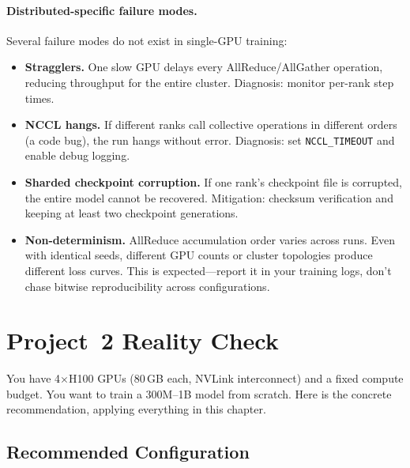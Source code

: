 \paragraph{Distributed-specific failure modes.} Several failure modes do not exist in single-GPU training:

\begin{itemize}[nosep]
  \item \textbf{Stragglers.} One slow GPU delays every AllReduce/AllGather operation, reducing throughput for the entire cluster. Diagnosis: monitor per-rank step times.
  \item \textbf{NCCL hangs.} If different ranks call collective operations in different orders (a code bug), the run hangs without error. Diagnosis: set \texttt{NCCL\_TIMEOUT} and enable debug logging.
  \item \textbf{Sharded checkpoint corruption.} If one rank's checkpoint file is corrupted, the entire model cannot be recovered. Mitigation: checksum verification and keeping at least two checkpoint generations.
  \item \textbf{Non-determinism.} AllReduce accumulation order varies across runs. Even with identical seeds, different GPU counts or cluster topologies produce different loss curves. This is expected---report it in your training logs, don't chase bitwise reproducibility across configurations.
\end{itemize}


\section{Project~2 Reality Check}
\label{sec:project2-reality}

You have 4$\times$H100 GPUs (80\,GB each, NVLink interconnect) and a fixed compute budget. You want to train a 300M--1B model from scratch. Here is the concrete recommendation, applying everything in this chapter.

\subsection{Recommended Configuration}

